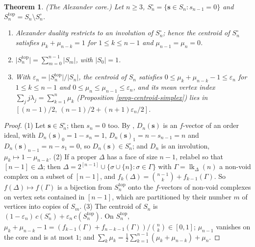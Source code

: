 \documentclass[11pt, a4paper, abstract=yes]{scrartcl}
\theoremstyle{definition}
\theoremstyle{remark}
\theoremstyle{plain}
\newtheorem{theorem}[definition]{Theorem}
\newcommand{\vek}[1]{\boldsymbol{#1}}
\theoremstyle{remark}
\theoremstyle{plain}
\newcommand{\leandiscof}[1]{\tikz[baseline=-0.6ex]\fill[#1] (0,0) circle (0.6ex);}
\newcommand{\leanfull}{\leandiscof{leanfull}}
\newcommand{\leanmark}[1]{\leavevmode{\reversemarginpar\marginnote{\raggedleft#1}}}
\begin{document}
\begin{theorem}
\leanmark{\leanfull}(\emph{The Alexander core.}) Let \(n\ge3\), \(S_n^\circ=\lbrace\vek s\in S_n:s_{n-1}=0\rbrace\) and
\(S_n^{\mathrm{top}}=S_n\setminus S_n^\circ\).
\begin{enumerate}
\item Alexander duality restricts to an involution of \(S_n^\circ\); hence the centroid of \(S_n^\circ\)
satisfies \(\mu_k+\mu_{n-k}=1\) for \(1\le k\le n-1\) and \(\mu_{n-1}=\mu_n=0\).
\item \(\lvert S_n^{\mathrm{top}}\rvert=\sum_{m=0}^{n-1}\lvert S_m\rvert\), with \(\lvert S_0\rvert=1\).
\item With \(\varepsilon_n=\lvert S_n^{\mathrm{top}}\rvert/\lvert S_n\rvert\), the centroid of \(S_n\)
satisfies \(0\le\mu_k+\mu_{n-k}-1\le\varepsilon_n\) for \(1\le k\le n-1\) and
\(0\le\mu_n\le\mu_{n-1}\le\varepsilon_n\), and its mean vertex index
\(\sum_jj\lambda_j=\sum_{k=1}^n\mu_k\) (Proposition \ref{prop-centroid-simplex}) lies in
\([(n-1)/2,\ (n-1)/2+(n+1)\varepsilon_n/2]\).
\end{enumerate}
\label{thm-alexander-core}
\end{theorem}

\begin{proof}
(1) Let \(\vek s\in S_n^\circ\); then \(s_n=0\) too. By \autocite[Lemma 14]{SnellmanArticle2},
\(D_n(\vek s)\) is an \(f\)-vector of an order ideal, with \(D_n(\vek s)_0=1-s_n=1\),
\(D_n(\vek s)_1=n-s_{n-1}=n\) and \(D_n(\vek s)_{n-1}=n-s_1=0\), so \(D_n(\vek s)\in S_n^\circ\); and \(D_n\)
is an involution, \(\mu_k\mapsto1-\mu_{n-k}\). (2) If a proper \(\Delta\) has a face of size \(n-1\),
relabel so that \([n-1]\in\Delta\); then \(\Delta=2^{[n-1]}\cup\lbrace\sigma\cup\lbrace n\rbrace:\sigma\in\Gamma\rbrace\)
with \(\Gamma=\operatorname{lk}_\Delta(n)\) a non-void complex on a subset of \([n-1]\), and
\(f_k(\Delta)=\binom{n-1}k+f_{k-1}(\Gamma)\). So \(f(\Delta)\mapsto f(\Gamma)\) is a bijection from
\(S_n^{\mathrm{top}}\) onto the \(f\)-vectors of non-void complexes on vertex sets contained in
\([n-1]\), which are partitioned by their number \(m\) of vertices into copies of \(S_m\). (3) The
centroid of \(S_n\) is \((1-\varepsilon_n)\,c(S_n^\circ)+\varepsilon_n\,c(S_n^{\mathrm{top}})\). On
\(S_n^{\mathrm{top}}\), \(\mu_k+\mu_{n-k}-1=(f_{k-1}(\Gamma)+f_{n-k-1}(\Gamma))/\binom nk\in[0,1]\);
\(\mu_{n-1}\) vanishes on the core and is at most \(1\); and
\(\sum_k\mu_k=\tfrac12\sum_{k=1}^{n-1}(\mu_k+\mu_{n-k})+\mu_n\).
\end{proof}
\end{document}
